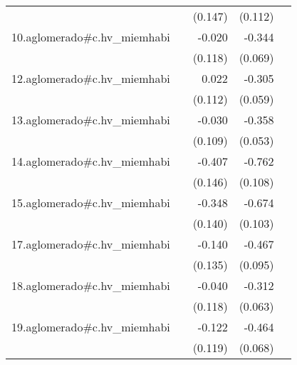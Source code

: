 {\begin{longtable}{l*{4}{D{.}{.}{-1}}}
            &                     &     (0.147)         &     (0.112)         &                     \\
\addlinespace
10.aglomerado#c.hv\_miemhabi&                     &      -0.020         &      -0.344\sym{***}&                     \\
            &                     &     (0.118)         &     (0.069)         &                     \\
\addlinespace
12.aglomerado#c.hv\_miemhabi&                     &       0.022         &      -0.305\sym{***}&                     \\
            &                     &     (0.112)         &     (0.059)         &                     \\
\addlinespace
13.aglomerado#c.hv\_miemhabi&                     &      -0.030         &      -0.358\sym{***}&                     \\
            &                     &     (0.109)         &     (0.053)         &                     \\
\addlinespace
14.aglomerado#c.hv\_miemhabi&                     &      -0.407\sym{**} &      -0.762\sym{***}&                     \\
            &                     &     (0.146)         &     (0.108)         &                     \\
\addlinespace
15.aglomerado#c.hv\_miemhabi&                     &      -0.348\sym{*}  &      -0.674\sym{***}&                     \\
            &                     &     (0.140)         &     (0.103)         &                     \\
\addlinespace
17.aglomerado#c.hv\_miemhabi&                     &      -0.140         &      -0.467\sym{***}&                     \\
            &                     &     (0.135)         &     (0.095)         &                     \\
\addlinespace
18.aglomerado#c.hv\_miemhabi&                     &      -0.040         &      -0.312\sym{***}&                     \\
            &                     &     (0.118)         &     (0.063)         &                     \\
\addlinespace
19.aglomerado#c.hv\_miemhabi&                     &      -0.122         &      -0.464\sym{***}&                     \\
            &                     &     (0.119)         &     (0.068)         &                     \\

\end{longtable}}

